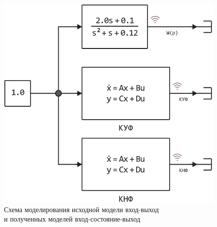 \documentclass[a4paper]{article}
\begin{document}
\begin{figure}[H]
    \centering
    \includegraphics[height=0.23\textheight]{sources/task1_model.png}
    \caption*{Схема моделирования исходной модели вход-выход\\и полученных моделей вход-состояние-выход}
\end{figure}
\end{document}
